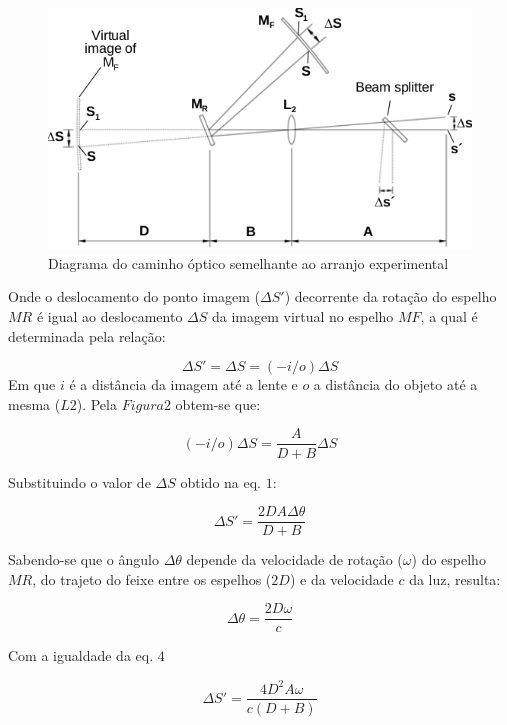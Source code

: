 \begin{figure}[!ht]
	\centering
	\includegraphics[scale=0.4]{3.png}
	\caption{Diagrama do caminho óptico semelhante ao arranjo experimental \cite{PASCO}}
\end{figure}
Onde o deslocamento do ponto imagem ($\Delta S'$) decorrente da rotação do espelho $MR$ é igual ao deslocamento $\Delta S$ da imagem virtual no espelho $MF$, a qual é determinada pela relação:

\begin{equation}
	\Delta S'= \Delta S=(-i/o)\Delta S
\end{equation}
Em que $i$ é a distância da imagem até a lente e $o$ a distância do objeto até a mesma ($L2$). Pela $Figura2$ obtem-se que:

\begin{equation}
	(-i/o)\Delta S=\frac{A}{D+B}\Delta S
\end{equation}
 
Substituindo o valor de $\Delta S$ obtido na eq. $1$:

\begin{equation}
	\Delta S'=\frac{2DA\Delta\theta}{D+B}
\end{equation}

Sabendo-se que o ângulo $\Delta\theta$ depende da velocidade de rotação ($\omega$) do espelho $MR$, do trajeto do feixe entre os espelhos ($2D$) e da velocidade $c$ da luz, resulta:

\begin{equation}
	\Delta\theta=\frac{2D\omega}{c}
\end{equation}

Com a igualdade da eq. $4$

\begin{equation}
	\Delta S'=\frac{4D^{2}A\omega}{c(D+B)}
\end{equation}

